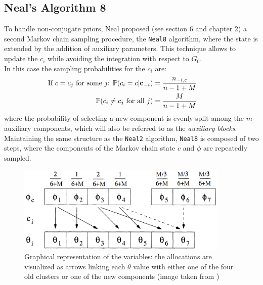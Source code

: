 \subsection{Neal's Algorithm 8} \label{neal8}
To handle non-conjugate priors, Neal proposed (see \cite{neal} section 6 and \cite{book} chapter 2) a second Markov chain sampling procedure, the \verb|Neal8| algorithm, where the state is extended by the addition of auxiliary parameters.
This technique allows to update the $c_i$ while avoiding the integration with respect to $G_0$. \\
In this case the sampling probabilities for the $c_i$ are:
\begin{equation}
	\begin{aligned}
		\hspace{-25pt}
		\vspace{-12pt}
		\text{If $c=c_j$ for some $j$: } \PP(c_i=c | \mathbf c_{-i}) &= \frac{n_{-i,c}}{n-1+M}   \\
		\PP(c_{i}\neq c_{j} \text{ for all } j) &=\frac{M }{n-1+M}
	\end{aligned}	
\end{equation}
where the probability of selecting a new component is evenly split among the $m$ auxiliary components, which will also be referred to as the \emph{auxiliary blocks}.
Maintaining the same structure as the \verb|Neal2| algorithm, \verb|Neal8| is composed of two steps, where the components of the Markov chain state $c$ and $\phi$ are repeatedly sampled.
\begin{figure}[h]
    \centering
    \includegraphics[width=0.9\textwidth]{etc/neal8.png}
    \captionsetup{labelformat=empty}
    \caption{Graphical representation of the variables: the allocations are visualized as arrows linking each $\theta$ value with either one of the four old clusters or one of the new components (image taken from \cite{neal})}
    \label{fig:neal8}
\end{figure}

